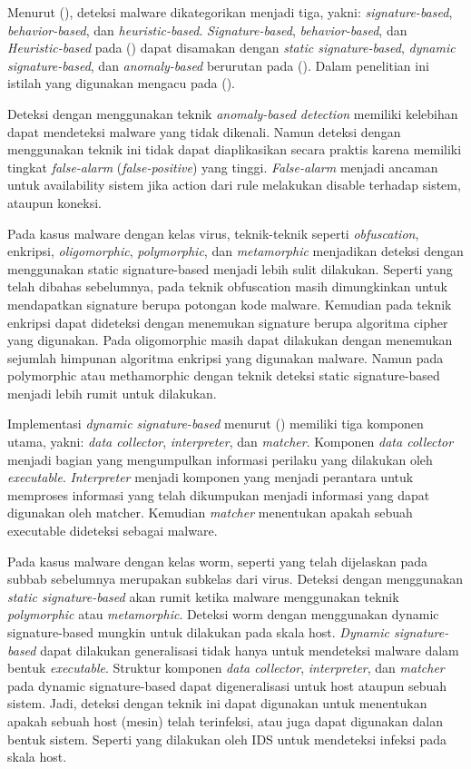 Menurut (\cite{6620049}), deteksi malware dikategorikan menjadi tiga, yakni: \textit{signature-based}, \textit{behavior-based}, dan \textit{heuristic-based}. \textit{Signature-based}, \textit{behavior-based}, dan \textit{Heuristic-based} pada (\cite{6620049}) dapat disamakan dengan \textit{static signature-based}, \textit{dynamic signature-based}, dan \textit{anomaly-based} berurutan pada (\cite{idika2007survey}). Dalam penelitian ini istilah yang digunakan mengacu pada (\cite{idika2007survey}).

Deteksi dengan menggunakan teknik \textit{anomaly-based detection} memiliki kelebihan dapat mendeteksi malware yang tidak dikenali. Namun deteksi dengan menggunakan teknik ini tidak dapat diaplikasikan secara praktis karena memiliki tingkat \textit{false-alarm} (\textit{false-positive}) yang tinggi. \textit{False-alarm} menjadi ancaman untuk availability sistem jika action dari rule melakukan disable terhadap sistem, ataupun koneksi.

Pada kasus malware dengan kelas virus, teknik-teknik seperti \textit{obfuscation}, enkripsi, \textit{oligomorphic}, \textit{polymorphic}, dan \textit{metamorphic} menjadikan deteksi dengan menggunakan static signature-based menjadi lebih sulit dilakukan. Seperti yang telah dibahas sebelumnya, pada teknik obfuscation masih dimungkinkan untuk mendapatkan signature berupa potongan kode malware. Kemudian pada teknik enkripsi dapat dideteksi dengan menemukan signature berupa algoritma cipher yang digunakan. Pada oligomorphic masih dapat dilakukan dengan menemukan sejumlah himpunan algoritma enkripsi yang digunakan malware. Namun pada polymorphic atau methamorphic dengan teknik deteksi static signature-based menjadi lebih rumit untuk dilakukan.

Implementasi \textit{dynamic signature-based} menurut (\cite{6620049}) memiliki tiga komponen utama, yakni: \textit{data collector}, \textit{interpreter}, dan \textit{matcher}. Komponen \textit{data collector} menjadi bagian yang mengumpulkan informasi perilaku yang dilakukan oleh \textit{executable}. \textit{Interpreter} menjadi komponen yang menjadi perantara untuk memproses informasi yang telah dikumpukan menjadi informasi yang dapat digunakan oleh matcher. Kemudian \textit{matcher} menentukan apakah sebuah executable dideteksi sebagai malware.

Pada kasus malware dengan kelas worm, seperti yang telah dijelaskan pada subbab sebelumnya merupakan subkelas dari virus. Deteksi dengan menggunakan \textit{static signature-based} akan rumit ketika malware menggunakan teknik \textit{polymorphic} atau \textit{metamorphic}. Deteksi worm dengan menggunakan dynamic signature-based mungkin untuk dilakukan pada skala host. \textit{Dynamic signature-based} dapat dilakukan generalisasi tidak hanya untuk mendeteksi malware dalam bentuk \textit{executable}. Struktur komponen \textit{data collector}, \textit{interpreter}, dan \textit{matcher} pada dynamic signature-based dapat digeneralisasi untuk host ataupun sebuah sistem. Jadi, deteksi dengan teknik ini dapat digunakan untuk menentukan apakah sebuah host (mesin) telah terinfeksi, atau juga dapat digunakan dalan bentuk sistem. Seperti yang dilakukan oleh IDS untuk mendeteksi infeksi pada skala host.

